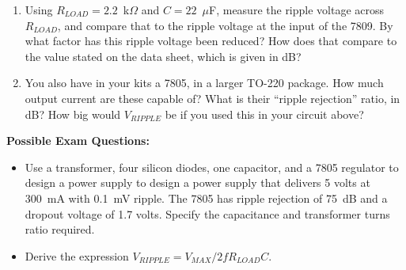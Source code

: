 \begin{enumerate}[wide]
\item Using $R_{LOAD} = 2.2$~k$\Omega$ and $C = 22$~$\mu$F, measure the ripple voltage across $R_{LOAD}$, and compare that to the ripple voltage at the input of the 7809.  By what factor has this ripple voltage been reduced?  How does that compare to the value stated on the data sheet, which is given in dB?

\item You also have in your kits a 7805, in a larger TO-220 package.  How much output current are these capable of?  What is their ``ripple rejection'' ratio, in dB?  How big would $V_{RIPPLE}$ be if you used this in your circuit above?

\end{enumerate}

\textbf{Possible Exam Questions:}

\begin{itemize}
\item Use a transformer, four silicon diodes, one capacitor, and a 7805 regulator to design a power supply to design a power supply that delivers 5 volts at 300~mA with 0.1~mV ripple.  The 7805 has ripple rejection of 75~dB and a dropout voltage of 1.7 volts.  Specify the capacitance and transformer turns ratio required.

\item Derive the expression $V_{RIPPLE}=V_{MAX}/2fR_{LOAD} C$.

\end{itemize}






